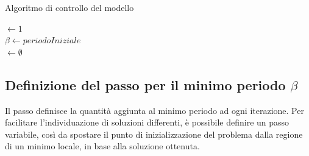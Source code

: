 \documentclass[a4paper,12pt]{report}
\begin{document}
\begin{algorithm}
  \caption{Algoritmo di controllo del modello}
  \label{controllo}

  \BlankLine
  \BlankLine

  \Passo $\leftarrow 1$ \\
  $\beta \leftarrow periodoIniziale$ \\
  \Soluzioni $\leftarrow \emptyset$ \\


\end{algorithm}

\subsection{Definizione del passo per il minimo periodo $\beta$}
\label{ss:passo}
Il passo definisce la quantità aggiunta al minimo periodo ad ogni iterazione.
Per facilitare l'individuazione di soluzioni differenti, è possibile definire un passo variabile, così da spostare il punto di inizializzazione del problema dalla regione di un minimo locale, in base alla soluzione ottenuta.
\end{document}
